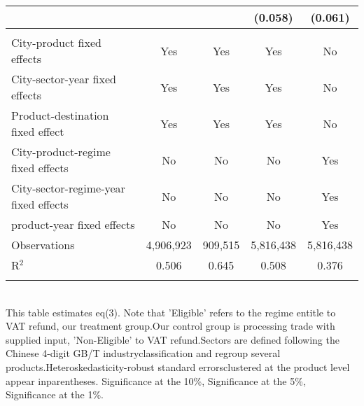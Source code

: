 \documentclass[preview]{standalone}
\begin{document}
\begin{table}[!htbp]
\begin{adjustbox}{width=\textwidth, totalheight=\baselineskip,keepaspectratio}
\begin{tabular}{@{\extracolsep{5pt}}lcccc}
  &  &  & (0.058) & (0.061) \\ 
 \hline \\[-1.8ex] 
City-product fixed effects & Yes & Yes & Yes & No \\ 
City-sector-year fixed effects & Yes & Yes & Yes & No \\ 
Product-destination fixed effect & Yes & Yes & Yes & No \\ 
City-product-regime fixed effects & No & No & No & Yes \\ 
City-sector-regime-year fixed effects & No & No & No & Yes \\ 
product-year fixed effects & No & No & No & Yes \\ 
Observations & 4,906,923 & 909,515 & 5,816,438 & 5,816,438 \\ 
R$^{2}$ & 0.506 & 0.645 & 0.508 & 0.376 \\ 
\hline 
\hline \\[-1.8ex] 
\end{tabular}
\end{adjustbox}
\begin{tablenotes} 
 \small 
 \item \\ 
This table estimates eq(3). Note that 'Eligible' refers to the regime entitle to VAT refund, our treatment group.Our control group is processing trade with supplied input, 'Non-Eligible' to VAT refund.Sectors are defined following the Chinese 4-digit GB/T industryclassification and regroup several products.Heteroskedasticity-robust standard errorsclustered at the product level appear inparentheses.\sym{*} Significance at the 10\%, \sym{**} Significance at the 5\%, \sym{***} Significance at the 1\%. 
\end{tablenotes}
\end{table} 
\end{document}
